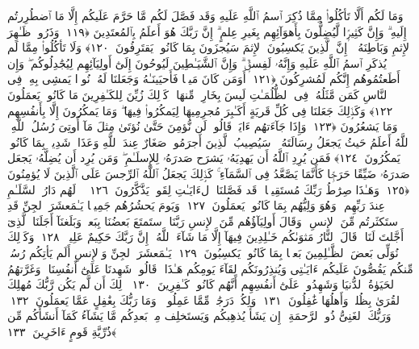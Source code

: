  وَمَا لَكُم أَلَّا تَأكُلُوا۟ مِمَّا ذُكِرَ ٱسمُ ٱللَّهِ عَلَيهِ وَقَد فَصَّلَ لَكُم مَّا حَرَّمَ عَلَيكُم إِلَّا مَا ٱضطُرِرتُم إِلَيهِ ۗ وَإِنَّ كَثِيرًۭا لَّيُضِلُّونَ بِأَهوَآئِهِم بِغَيرِ عِلمٍ ۗ إِنَّ رَبَّكَ هُوَ أَعلَمُ بِٱلمُعتَدِينَ ﴿١١٩﴾
 وَذَرُوا۟ ظَـٰهِرَ ٱلإِثمِ وَبَاطِنَهُۥٓ ۚ إِنَّ ٱلَّذِينَ يَكسِبُونَ ٱلإِثمَ سَيُجزَونَ بِمَا كَانُوا۟ يَقتَرِفُونَ ﴿١٢٠﴾
 وَلَا تَأكُلُوا۟ مِمَّا لَم يُذكَرِ ٱسمُ ٱللَّهِ عَلَيهِ وَإِنَّهُۥ لَفِسقٌۭ ۗ وَإِنَّ ٱلشَّيَـٰطِينَ لَيُوحُونَ إِلَىٰٓ أَولِيَآئِهِم لِيُجَٰدِلُوكُم ۖ وَإِن أَطَعتُمُوهُم إِنَّكُم لَمُشرِكُونَ ﴿١٢١﴾
 أَوَمَن كَانَ مَيتًۭا فَأَحيَينَـٰهُ وَجَعَلنَا لَهُۥ نُورًۭا يَمشِى بِهِۦ فِى ٱلنَّاسِ كَمَن مَّثَلُهُۥ فِى ٱلظُّلُمَـٰتِ لَيسَ بِخَارِجٍۢ مِّنهَا ۚ كَذَٟلِكَ زُيِّنَ لِلكَـٰفِرِينَ مَا كَانُوا۟ يَعمَلُونَ ﴿١٢٢﴾
 وَكَذَٟلِكَ جَعَلنَا فِى كُلِّ قَريَةٍ أَكَـٰبِرَ مُجرِمِيهَا لِيَمكُرُوا۟ فِيهَا ۖ وَمَا يَمكُرُونَ إِلَّا بِأَنفُسِهِم وَمَا يَشعُرُونَ ﴿١٢٣﴾
 وَإِذَا جَآءَتهُم ءَايَةٌۭ قَالُوا۟ لَن نُّؤمِنَ حَتَّىٰ نُؤتَىٰ مِثلَ مَآ أُوتِىَ رُسُلُ ٱللَّهِ ۘ ٱللَّهُ أَعلَمُ حَيثُ يَجعَلُ رِسَالَتَهُۥ ۗ سَيُصِيبُ ٱلَّذِينَ أَجرَمُوا۟ صَغَارٌ عِندَ ٱللَّهِ وَعَذَابٌۭ شَدِيدٌۢ بِمَا كَانُوا۟ يَمكُرُونَ ﴿١٢٤﴾
 فَمَن يُرِدِ ٱللَّهُ أَن يَهدِيَهُۥ يَشرَح صَدرَهُۥ لِلإِسلَـٰمِ ۖ وَمَن يُرِد أَن يُضِلَّهُۥ يَجعَل صَدرَهُۥ ضَيِّقًا حَرَجًۭا كَأَنَّمَا يَصَّعَّدُ فِى ٱلسَّمَآءِ ۚ كَذَٟلِكَ يَجعَلُ ٱللَّهُ ٱلرِّجسَ عَلَى ٱلَّذِينَ لَا يُؤمِنُونَ ﴿١٢٥﴾
 وَهَـٰذَا صِرَٰطُ رَبِّكَ مُستَقِيمًۭا ۗ قَد فَصَّلنَا ٱلءَايَـٰتِ لِقَومٍۢ يَذَّكَّرُونَ ﴿١٢٦﴾
 ۞ لَهُم دَارُ ٱلسَّلَـٰمِ عِندَ رَبِّهِم ۖ وَهُوَ وَلِيُّهُم بِمَا كَانُوا۟ يَعمَلُونَ ﴿١٢٧﴾
 وَيَومَ يَحشُرُهُم جَمِيعًۭا يَـٰمَعشَرَ ٱلجِنِّ قَدِ ٱستَكثَرتُم مِّنَ ٱلإِنسِ ۖ وَقَالَ أَولِيَآؤُهُم مِّنَ ٱلإِنسِ رَبَّنَا ٱستَمتَعَ بَعضُنَا بِبَعضٍۢ وَبَلَغنَآ أَجَلَنَا ٱلَّذِىٓ أَجَّلتَ لَنَا ۚ قَالَ ٱلنَّارُ مَثوَىٰكُم خَـٰلِدِينَ فِيهَآ إِلَّا مَا شَآءَ ٱللَّهُ ۗ إِنَّ رَبَّكَ حَكِيمٌ عَلِيمٌۭ ﴿١٢٨﴾
 وَكَذَٟلِكَ نُوَلِّى بَعضَ ٱلظَّـٰلِمِينَ بَعضًۢا بِمَا كَانُوا۟ يَكسِبُونَ ﴿١٢٩﴾
 يَـٰمَعشَرَ ٱلجِنِّ وَٱلإِنسِ أَلَم يَأتِكُم رُسُلٌۭ مِّنكُم يَقُصُّونَ عَلَيكُم ءَايَـٰتِى وَيُنذِرُونَكُم لِقَآءَ يَومِكُم هَـٰذَا ۚ قَالُوا۟ شَهِدنَا عَلَىٰٓ أَنفُسِنَا ۖ وَغَرَّتهُمُ ٱلحَيَوٰةُ ٱلدُّنيَا وَشَهِدُوا۟ عَلَىٰٓ أَنفُسِهِم أَنَّهُم كَانُوا۟ كَـٰفِرِينَ ﴿١٣٠﴾
 ذَٟلِكَ أَن لَّم يَكُن رَّبُّكَ مُهلِكَ ٱلقُرَىٰ بِظُلمٍۢ وَأَهلُهَا غَٰفِلُونَ ﴿١٣١﴾
 وَلِكُلٍّۢ دَرَجَٰتٌۭ مِّمَّا عَمِلُوا۟ ۚ وَمَا رَبُّكَ بِغَٰفِلٍ عَمَّا يَعمَلُونَ ﴿١٣٢﴾
 وَرَبُّكَ ٱلغَنِىُّ ذُو ٱلرَّحمَةِ ۚ إِن يَشَأ يُذهِبكُم وَيَستَخلِف مِنۢ بَعدِكُم مَّا يَشَآءُ كَمَآ أَنشَأَكُم مِّن ذُرِّيَّةِ قَومٍ ءَاخَرِينَ ﴿١٣٣﴾
